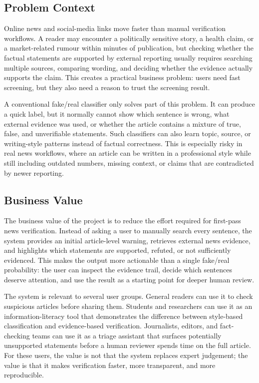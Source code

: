 \documentclass[11pt]{article}
\begin{document}
\subsection{Problem Context}

Online news and social-media links move faster than manual verification
workflows. A reader may encounter a politically sensitive story, a health claim,
or a market-related rumour within minutes of publication, but checking whether
the factual statements are supported by external reporting usually requires
searching multiple sources, comparing wording, and deciding whether the evidence
actually supports the claim. This creates a practical business problem: users
need fast screening, but they also need a reason to trust the screening result.

A conventional fake/real classifier only solves part of this problem. It can
produce a quick label, but it normally cannot show which sentence is wrong, what
external evidence was used, or whether the article contains a mixture of true,
false, and unverifiable statements. Such classifiers can also learn topic,
source, or writing-style patterns instead of factual correctness. This is
especially risky in real news workflows, where an article can be written in a
professional style while still including outdated numbers, missing context, or
claims that are contradicted by newer reporting.

\subsection{Business Value}

The business value of the project is to reduce the effort required for first-pass
news verification. Instead of asking a user to manually search every sentence,
the system provides an initial article-level warning, retrieves external news
evidence, and highlights which statements are supported, refuted, or not
sufficiently evidenced. This makes the output more actionable than a single
fake/real probability: the user can inspect the evidence trail, decide which
sentences deserve attention, and use the result as a starting point for deeper
human review.

The system is relevant to several user groups. General readers can use it to
check suspicious articles before sharing them. Students and researchers can use
it as an information-literacy tool that demonstrates the difference between
style-based classification and evidence-based verification. Journalists,
editors, and fact-checking teams can use it as a triage assistant that surfaces
potentially unsupported statements before a human reviewer spends time on the
full article. For these users, the value is not that the system replaces expert
judgement; the value is that it makes verification faster, more transparent, and
more reproducible.
\end{document}
